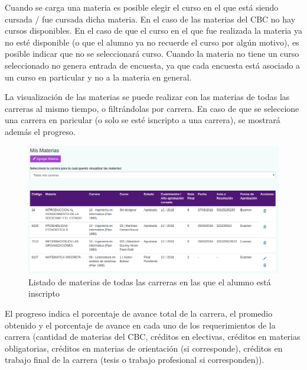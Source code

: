 \documentclass[a4paper]{article}
\begin{document}
Cuando se carga una materia es posible elegir el curso en el que está siendo cursada / fue cursada dicha materia. En el caso de las materias del CBC no hay cursos disponibles. En el caso de que el curso en el que fue realizada la materia ya no esté disponible (o que el alumno ya no recuerde el curso por algún motivo), es posible indicar que no se seleccionará curso. Cuando la materia no tiene un curso seleccionado no genera entrada de encuesta, ya que cada encuesta está asociado a un curso en particular y no a la materia en general.\newline

La visualización de las materias se puede realizar con las materias de todas las carreras al mismo tiempo, o filtrándolas por carrera. En caso de que se seleccione una carrera en paricular (o solo se esté isncripto a una carrera), se mostrará además el progreso.\newline

\begin{figure}[H]
\centering
\includegraphics[scale=0.35]{Imagenes/mis_materias_todas.png}\par
\caption{Listado de materias de todas las carreras en las que el alumno está inscripto}
\end{figure}

El progreso indica el porcentaje de avance total de la carrera, el promedio obtenido y el porcentaje de avance en cada uno de los requerimientos de la carrera (cantidad de materias del CBC, créditos en electivas, créditos en materias obligatorias, créditos en materias de orientación (si corresponde), créditos en trabajo final de la carrera (tesis o trabajo profesional si corresponden)).\newline
\end{document}
